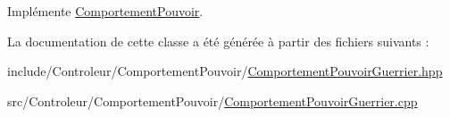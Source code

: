 Implémente \hyperlink{class_comportement_pouvoir_a8b8f4e753291ab73ab0016106f3948ff}{Comportement\-Pouvoir}.



La documentation de cette classe a été générée à partir des fichiers suivants \-:\begin{DoxyCompactItemize}
\item 
include/\-Controleur/\-Comportement\-Pouvoir/\hyperlink{_comportement_pouvoir_guerrier_8hpp}{Comportement\-Pouvoir\-Guerrier.\-hpp}\item 
src/\-Controleur/\-Comportement\-Pouvoir/\hyperlink{_comportement_pouvoir_guerrier_8cpp}{Comportement\-Pouvoir\-Guerrier.\-cpp}\end{DoxyCompactItemize}
